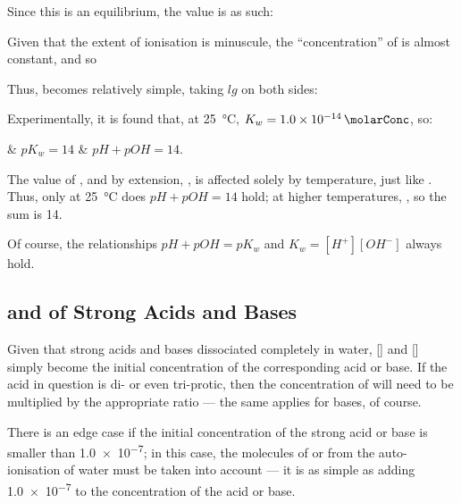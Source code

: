 			Since this is an equilibrium, the \Kc{} value is as such:


			Given that the extent of ionisation is minuscule, the ``concentration'' of  is almost constant, and so


			Thus, \pKw{} becomes relatively simple, taking $lg$ on both sides:


			Experimentally, it is found that, at \SI{25}{\celsius}, $K_{w} = \SI{1.0e-14}{\molarConc}$, so:
			\begin{bulletlist}
				& $pK_{w} = 14$
				& $pH + pOH = 14$.
			\end{bulletlist}

			The value of \Kw{}, and by extension, \pKw{}, is affected solely by temperature, just like \Kc{}. Thus, only at \SI{25}{\celsius}
			does $pH + pOH = 14$ hold; at higher temperatures, \Kw{} , so the sum is  \num{14}.

			Of course, the relationships $pH + pOH = pK_{w}$ and $K_{w} = [H^{+}][OH^{-}]$ always hold.



		\pagebreak
		\subsection{\MpH{} and \MpOH{} of Strong Acids and Bases}

			Given that strong acids and bases dissociated completely in water, [] and [] simply become the initial concentration
			of the corresponding acid or base. If the acid in question is di- or even tri-protic, then the concentration of  will need
			to be multiplied by the appropriate ratio --- the same applies for bases, of course.

			There is an edge case if the initial concentration of the strong acid or base is smaller than \SI{1.0e-7}{\molarConc}; in this case,
			the molecules of  or  from the auto-ionisation of water must be taken into account --- it is as simple as adding
			\num{1.0e-7} to the concentration of the acid or base.

